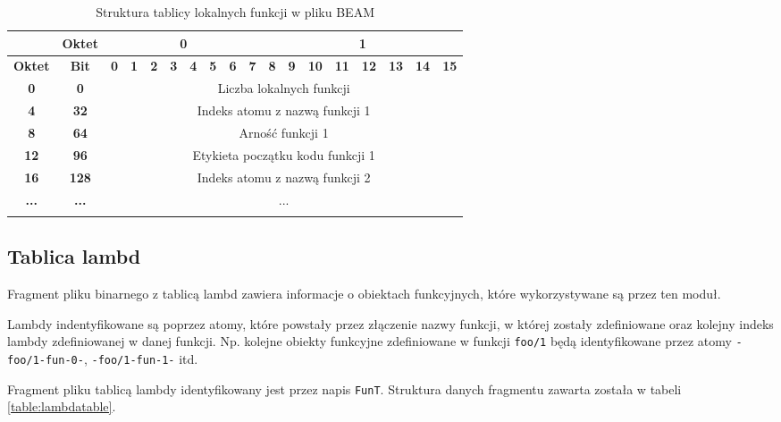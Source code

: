 \begin{longtable}{|c|c|c|c|c|c|c|c|c|c|c|c|c|c|c|c|c|c|}
\hline
         & \textbf{Oktet} & \multicolumn{8}{|c|}{\textbf{0}} & \multicolumn{8}{|c|}{\textbf{1}} \\
\hline
\textbf{Oktet} & \textbf{Bit} & \textbf{0} & \textbf{1} & \textbf{2} & \textbf{3} & \textbf{4} & \textbf{5} & \textbf{6} & \textbf{7} & \textbf{8} & \textbf{9} & \textbf{10} & \textbf{11} & \textbf{12} & \textbf{13} & \textbf{14} & \textbf{15}\\
\hline
\textbf{0} & \textbf{0} & \multicolumn{16}{|c|}{Liczba lokalnych funkcji} \\[3ex]
\hline
\textbf{4} & \textbf{32} & \multicolumn{16}{|c|}{Indeks atomu z nazwą funkcji 1}\\[3ex]
\hline
\textbf{8} & \textbf{64} & \multicolumn{16}{|c|}{Arność funkcji 1} \\[3ex]
\hline
\textbf{12} & \textbf{96} & \multicolumn{16}{|c|}{Etykieta początku kodu funkcji 1}\\[3ex]
\hline
\textbf{16} & \textbf{128} & \multicolumn{16}{|c|}{Indeks atomu z nazwą funkcji 2}\\[3ex]
\hline
\textbf{...} & \textbf{...} & \multicolumn{16}{|c|}{...}  \\[3ex]
\hline
\caption{Struktura tablicy lokalnych funkcji w pliku BEAM}
\label{table:localtable} \\
\end{longtable}

\subsection{Tablica lambd}
Fragment pliku binarnego z tablicą lambd zawiera informacje o obiektach funkcyjnych, które wykorzystywane są przez ten moduł.

Lambdy indentyfikowane są poprzez atomy, które powstały przez złączenie nazwy funkcji, w której zostały zdefiniowane oraz kolejny indeks lambdy zdefiniowanej w danej funkcji.
Np. kolejne obiekty funkcyjne zdefiniowane w funkcji \texttt{foo/1} będą identyfikowane przez atomy \texttt{-foo/1-fun-0-}, \texttt{-foo/1-fun-1-} itd.

Fragment pliku tablicą lambdy identyfikowany jest przez napis \texttt{FunT}. Struktura danych fragmentu zawarta została w tabeli \ref{table:lambdatable}.


